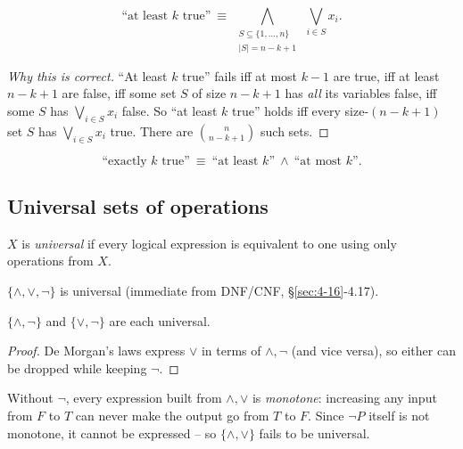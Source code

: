 \begin{definition}
\[
\text{``at least } k \text{ true''} \ \equiv\ \bigwedge_{\substack{S\subseteq\{1,\dots,n\} \\ |S|=n-k+1}} \ \bigvee_{i\in S} x_i.
\]
\end{definition}
\begin{proof}[Why this is correct]
``At least $k$ true'' fails iff at most $k-1$ are true, iff at least $n-k+1$ are false, iff some set $S$ of size $n-k+1$ has \emph{all} its variables false, iff some $S$ has $\bigvee_{i\in S}x_i$ false. So ``at least $k$ true'' holds iff every size-$(n{-}k{+}1)$ set $S$ has $\bigvee_{i\in S}x_i$ true. There are $\binom{n}{n-k+1}$ such sets.
\end{proof}

\begin{definition}[Exactly $k$]
\[
\text{``exactly } k \text{ true''} \ \equiv\ \text{``at least } k\text{''} \ \wedge\ \text{``at most } k\text{''}.
\]
\end{definition}

\subsection{Universal sets of operations}
\label{sec:4-20}

\begin{definition}
$X$ is \emph{universal} if every logical expression is equivalent to one using only operations from $X$.
\end{definition}

\begin{proposition}
$\{\wedge,\vee,\neg\}$ is universal (immediate from DNF/CNF, \S\ref{sec:4-16}-4.17).
\end{proposition}

\begin{corollary}
$\{\wedge,\neg\}$ and $\{\vee,\neg\}$ are each universal.
\end{corollary}
\begin{proof}
De Morgan's laws express $\vee$ in terms of $\wedge,\neg$ (and vice versa), so either can be dropped while keeping $\neg$.
\end{proof}

\bigskip
\begin{note}
Without $\neg$, every expression built from $\wedge,\vee$ is \emph{monotone}: increasing any input from $F$ to $T$ can never make the output go from $T$ to $F$. Since $\neg P$ itself is not monotone, it cannot be expressed -- so $\{\wedge,\vee\}$ fails to be universal.
\end{note}


